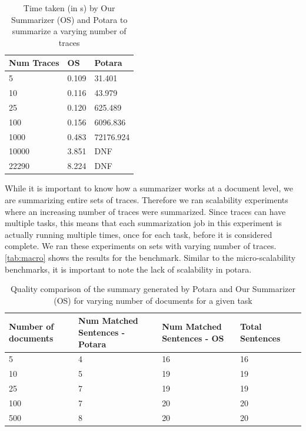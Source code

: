 \begin{table}[]
    \begin{tabular}{|l|l|l|}
    \hline
    Num Traces & OS    & Potara    \\ \hline \hline
    5          & 0.109 & 31.401    \\ \hline
    10         & 0.116 & 43.979    \\ \hline
    25         & 0.120 & 625.489   \\ \hline
    100        & 0.156 & 6096.836  \\ \hline
    1000       & 0.483 & 72176.924 \\ \hline
    10000      & 3.851 & DNF       \\ \hline
    22290      & 8.224 & DNF       \\ \hline
    \end{tabular}
    \caption{Time taken (in s) by Our Summarizer (OS) and Potara to summarize a varying number of traces}
    \label{tab:macro}
\end{table}

 While it is important to know how a summarizer works at a document level, we are summarizing entire sets of traces. Therefore
we ran scalability experiments where an increasing number of traces were summarized. Since traces can have multiple tasks, this means that each summarization job 
in this experiment is actually running multiple times, once for each task, before it is considered complete. We ran these experiments on sets with varying number of traces.
\autoref{tab:macro} shows the results for the benchmark. Similar to the micro-scalability benchmarks, it is important to note the lack of scalability in potara. 

\begin{table}[]
    \begin{tabular}{|l|l|l|l|l|}
    \hline
    Number of documents & Num Matched Sentences - Potara & Num Matched Sentences - OS & Total Sentences \\
    \hline
    \hline
    5                   & 4                              & 16                         & 16              \\
    \hline
    10                  & 5                              & 19                         & 19              \\
    \hline
    25                  & 7                              & 19                         & 19              \\
    \hline
    100                 & 7                              & 20                         & 20              \\
    \hline
    500                 & 8                              & 20                         & 20              \\
    \hline
    \end{tabular}
    \caption{Quality comparison of the summary generated by Potara and Our Summarizer (OS) for varying number of documents for a given task}
    \label{tab:quality}
\end{table}

